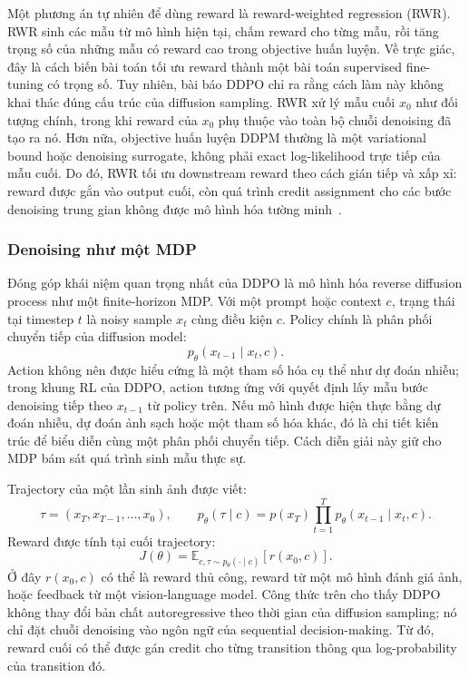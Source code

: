 Một phương án tự nhiên để dùng reward là reward-weighted regression (RWR).
RWR sinh các mẫu từ mô hình hiện tại, chấm reward cho từng mẫu, rồi tăng trọng số của những mẫu có reward cao trong objective huấn luyện.
Về trực giác, đây là cách biến bài toán tối ưu reward thành một bài toán supervised fine-tuning có trọng số.
Tuy nhiên, bài báo DDPO chỉ ra rằng cách làm này không khai thác đúng cấu trúc của diffusion sampling.
RWR xử lý mẫu cuối $x_0$ như đối tượng chính, trong khi reward của $x_0$ phụ thuộc vào toàn bộ chuỗi denoising đã tạo ra nó.
Hơn nữa, objective huấn luyện DDPM thường là một variational bound hoặc denoising surrogate, không phải exact log-likelihood trực tiếp của mẫu cuối.
Do đó, RWR tối ưu downstream reward theo cách gián tiếp và xấp xỉ: reward được gắn vào output cuối, còn quá trình credit assignment cho các bước denoising trung gian không được mô hình hóa tường minh~\citep{black2024ddpo}.

\subsubsection*{Denoising như một MDP}

Đóng góp khái niệm quan trọng nhất của DDPO là mô hình hóa reverse diffusion process như một finite-horizon MDP.
Với một prompt hoặc context $c$, trạng thái tại timestep $t$ là noisy sample $x_t$ cùng điều kiện $c$.
Policy chính là phân phối chuyển tiếp của diffusion model:
\begin{equation}
    p_\theta(x_{t-1}\mid x_t,c).
\end{equation}
Action không nên được hiểu cứng là một tham số hóa cụ thể như dự đoán nhiễu; trong khung RL của DDPO, action tương ứng với quyết định lấy mẫu bước denoising tiếp theo $x_{t-1}$ từ policy trên.
Nếu mô hình được hiện thực bằng dự đoán nhiễu, dự đoán ảnh sạch hoặc một tham số hóa khác, đó là chi tiết kiến trúc để biểu diễn cùng một phân phối chuyển tiếp.
Cách diễn giải này giữ cho MDP bám sát quá trình sinh mẫu thực sự.

Trajectory của một lần sinh ảnh được viết:
\begin{equation}
    \tau=(x_T,x_{T-1},\ldots,x_0),
    \qquad
    p_\theta(\tau\mid c)
    =
    p(x_T)\prod_{t=1}^{T}p_\theta(x_{t-1}\mid x_t,c).
\end{equation}
Reward được tính tại cuối trajectory:
\begin{equation}
    J(\theta)
    =
    \mathbb{E}_{c,\tau\sim p_\theta(\cdot\mid c)}
    \left[
        r(x_0,c)
    \right].
\end{equation}
Ở đây $r(x_0,c)$ có thể là reward thủ công, reward từ một mô hình đánh giá ảnh, hoặc feedback từ một vision-language model.
Công thức trên cho thấy DDPO không thay đổi bản chất autoregressive theo thời gian của diffusion sampling; nó chỉ đặt chuỗi denoising vào ngôn ngữ của sequential decision-making.
Từ đó, reward cuối có thể được gán credit cho từng transition thông qua log-probability của transition đó.

